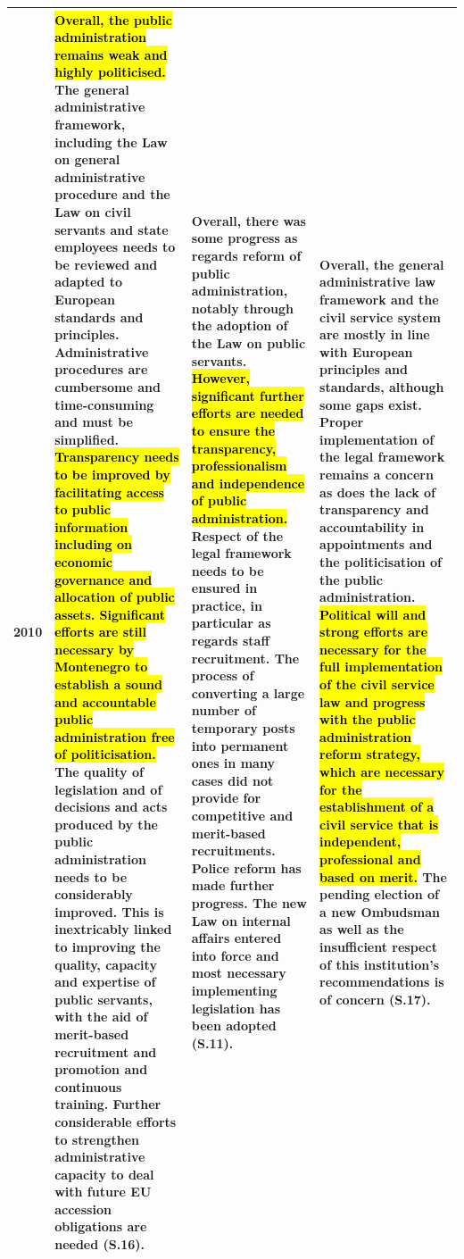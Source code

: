 \begin{longtable}[H]{|p{1cm}|L{45mm}|L{45mm}|L{45mm}|}
2010&\scriptsize{
\hl{Overall, the public administration remains weak and highly politicised.} The general administrative framework, including the Law on general administrative procedure and the Law on civil servants and state employees needs to be reviewed and adapted to European standards and principles. Administrative procedures are cumbersome and time-consuming and must be simplified. \hl{Transparency needs to be improved by facilitating access to public information including on economic governance and allocation of public assets. Significant efforts are still necessary by Montenegro to establish a sound and accountable public administration free of politicisation.} The quality of legislation and of decisions and acts produced by the public administration needs to be considerably improved. This is inextricably linked to improving the quality, capacity and expertise of public servants, with the aid of merit-based recruitment and promotion and continuous training. Further considerable efforts to strengthen administrative capacity to deal with future EU accession obligations are needed (S.16).}&\scriptsize{
Overall, there was some progress as regards reform of public administration, notably through the adoption of the Law on public servants. \hl{However, significant further efforts are needed to ensure the transparency, professionalism and independence of public administration.} Respect of the legal framework needs to be ensured in practice, in particular as regards staff recruitment. The process of converting a large number of temporary posts into permanent ones in many cases did not provide for competitive and merit-based recruitments. Police reform has made further progress. The new Law on internal affairs entered into force and most necessary implementing legislation has been adopted (S.11).}&\scriptsize{
Overall, the general administrative law framework and the civil service system are mostly in line with European principles and standards, although some gaps exist. Proper implementation of the legal framework remains a concern as does the lack of transparency and accountability in appointments and the politicisation of the public administration. \hl{Political will and strong efforts are necessary for the full implementation of the civil service law and progress with the public administration reform strategy, which are necessary for the establishment of a civil service that is independent, professional and based on merit.} The pending election of a new Ombudsman as well as the insufficient respect of this institution's recommendations is of concern (S.17).}\\\hline

\end{longtable}
